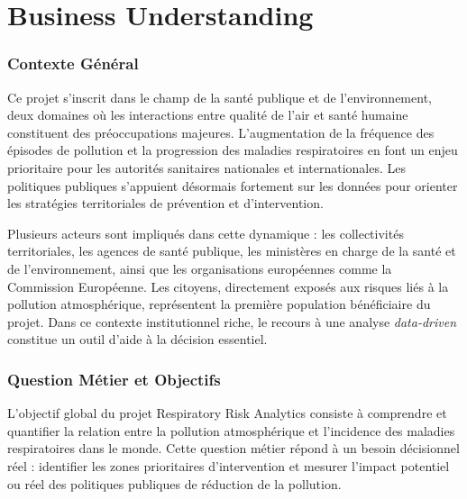 \documentclass[11pt,a4paper]{article}
\newcommand{\currentpart}{}
\let\oldpart\part
\renewcommand{\part}[1]{%
  \oldpart{#1}%
  \renewcommand{\currentpart}{\thepart.\ #1}%
  \markboth{\currentpart}{}%
}
\begin{document}
\clearpage
\part{Business Understanding}

\section{Contexte Général}

Ce projet s'inscrit dans le champ de la santé publique et de l'environnement, deux domaines où les interactions entre qualité de l'air et santé humaine constituent des préoccupations majeures. L'augmentation de la fréquence des épisodes de pollution et la progression des maladies respiratoires en font un enjeu prioritaire pour les autorités sanitaires nationales et internationales. Les politiques publiques s'appuient désormais fortement sur les données pour orienter les stratégies territoriales de prévention et d'intervention.

Plusieurs acteurs sont impliqués dans cette dynamique : les collectivités territoriales, les agences de santé publique, les ministères en charge de la santé et de l'environnement, ainsi que les organisations européennes comme la Commission Européenne. Les citoyens, directement exposés aux risques liés à la pollution atmosphérique, représentent la première population bénéficiaire du projet. Dans ce contexte institutionnel riche, le recours à une analyse \textit{data-driven} constitue un outil d'aide à la décision essentiel.

\section{Question Métier et Objectifs}

L'objectif global du projet Respiratory Risk Analytics consiste à comprendre et quantifier la relation entre la pollution atmosphérique et l'incidence des maladies respiratoires dans le monde. Cette question métier répond à un besoin décisionnel réel : identifier les zones prioritaires d'intervention et mesurer l'impact potentiel ou réel des politiques publiques de réduction de la pollution.
\end{document}
